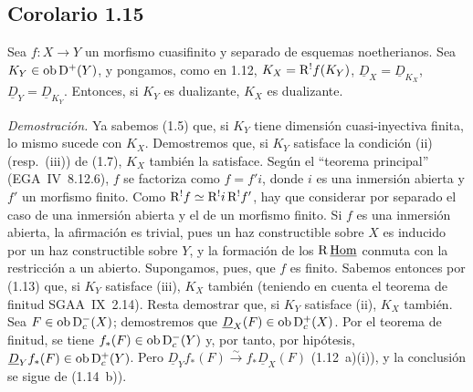 \subsection*{Corolario 1.15}
Sea $f : X \to Y$ un morfismo cuasifinito y separado de esquemas noetherianos. Sea $K_Y \in \operatorname{ob} \mathrm{D}^{+}(Y)$, y pongamos, como en 1.12, $K_X = \mathrm{R}^{!}f(K_Y)$, $\underline{D}_X = \underline{D}_{K_X}$, $\underline{D}_Y = \underline{D}_{K_Y}$. Entonces, si $K_Y$ es dualizante, $K_X$ es dualizante.

\emph{Demostración.} Ya sabemos (1.5) que, si $K_Y$ tiene dimensión cuasi-inyectiva finita, lo mismo sucede con $K_X$. Demostremos que, si $K_Y$ satisface la condición (ii) (resp.~(iii)) de (1.7), $K_X$ también la satisface. Según el \textquotedblleft teorema principal\textquotedblright{} (EGA~IV~8.12.6), $f$ se factoriza como $f = f'i$, donde $i$ es una inmersión abierta y $f'$ un morfismo finito. Como $\mathrm{R}^{!}f \simeq \mathrm{R}^{!}i \, \mathrm{R}^{!}f'$, hay que considerar por separado el caso de una inmersión abierta y el de un morfismo finito. Si $f$ es una inmersión abierta, la afirmación es trivial, pues un haz constructible sobre $X$ es inducido por un haz constructible sobre $Y$, y la formación de los $\mathrm{R}\,\underline{\operatorname{Hom}}$ conmuta con la restricción a un abierto. Supongamos, pues, que $f$ es finito. Sabemos entonces por (1.13) que, si $K_Y$ satisface (iii), $K_X$ también (teniendo en cuenta el teorema de finitud SGAA~IX~2.14). Resta demostrar que, si $K_Y$ satisface (ii), $K_X$ también. Sea $F \in \operatorname{ob} \mathrm{D}_c^{-}(X)$; demostremos que $\underline{D}_X(F) \in \operatorname{ob} \mathrm{D}_c^{+}(X)$. Por el teorema de finitud, se tiene $f_{*}(F) \in \operatorname{ob} \mathrm{D}_c^{-}(Y)$ y, por tanto, por hipótesis, $\underline{D}_Y f_{*}(F) \in \operatorname{ob} \mathrm{D}_c^{+}(Y)$. Pero $\underline{D}_Y f_{*}(F) \xrightarrow{\sim} f_{*}\underline{D}_X(F)$ (1.12~a)(i)), y la conclusión se sigue de (1.14~b)).
